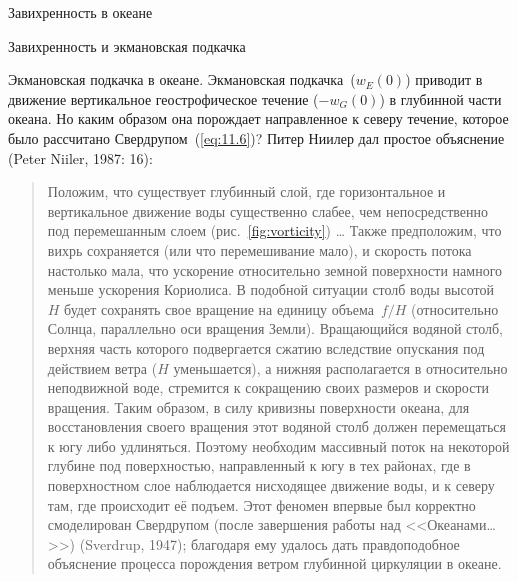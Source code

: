 \begin{chapter}{Завихренность в океане}
\begin{section}{Завихренность и экмановская подкачка}
\begin{paragraph}{Экмановская подкачка в океане.}
Экмановская подкачка~($w_E (0)$) приводит в движение вертикальное
геострофическое течение ($-w_G(0)$) в глубинной части океана. Но каким образом
она порождает направленное к северу течение, которое было рассчитано
Свердрупом~(\ref{eq:11.6})? Питер Ниилер дал простое 
объяснение (Peter Niiler, 1987: 16):
%
\begin{quotation}
Положим, что существует глубинный слой, где горизонтальное и
вертикальное движение воды существенно слабее, чем непосредственно под
перемешанным слоем
(рис.~\ref{fig:vorticity}) \dots{} Также предположим, что вихрь
сохраняется (или что перемешивание мало), и скорость потока настолько мала,
что ускорение относительно земной поверхности намного меньше ускорения
Кориолиса. В подобной ситуации столб воды высотой~$H$ будет сохранять
свое вращение на единицу объема~$f/H$ (относительно Солнца, параллельно
оси вращения Земли). Вращающийся водяной столб, верхняя часть которого 
подвергается сжатию вследствие опускания под действием ветра ($H$ уменьшается), 
а нижняя располагается в относительно неподвижной воде, стремится к 
сокращению своих размеров и скорости вращения. Таким образом, в силу
кривизны поверхности океана, для восстановления своего вращения этот 
водяной столб должен перемещаться к югу либо удлиняться.
Поэтому необходим массивный поток на некоторой глубине под
поверхностью, направленный к югу в тех районах, где в поверхностном слое
наблюдается нисходящее движение воды, и к северу там, где происходит её 
подъем. Этот феномен впервые был корректно смоделирован
Свердрупом (после завершения работы над <<Океанами\dots{}>>) (Sverdrup, 1947); 
благодаря ему удалось дать правдоподобное объяснение процесса порождения 
ветром глубинной циркуляции в океане.
\end{quotation}

\end{paragraph}
\end{section}
\end{chapter}
